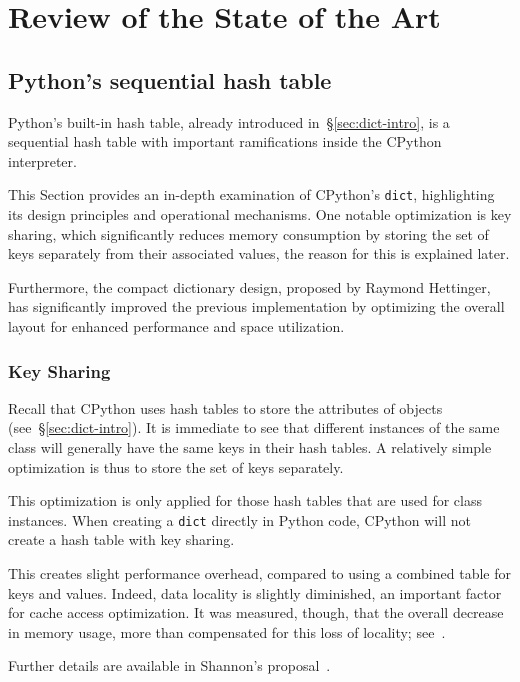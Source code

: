 \chapter{Review of the State of the Art}\label{ch:review}


\section{Python's sequential hash table}\label{sec:python-dict-review}

Python's built-in hash table, already introduced in~\S\ref{sec:dict-intro}, is a sequential hash table with important ramifications inside the CPython interpreter.

This Section provides an in-depth examination of CPython's \texttt{dict}, highlighting its design principles and operational mechanisms.
One notable optimization is key sharing, which significantly reduces memory consumption by storing the set of keys separately from their associated values, the reason for this is explained later.

Furthermore, the compact dictionary design, proposed by Raymond Hettinger, has significantly improved the previous implementation by optimizing the overall layout for enhanced performance and space utilization.


\subsection{Key Sharing}\label{subsec:key-sharing}

Recall that CPython uses hash tables to store the attributes of objects (see~\S\ref{sec:dict-intro}).
It is immediate to see that different instances of the same class will generally have the same keys in their hash tables.
A relatively simple optimization is thus to store the set of keys separately.

This optimization is only applied for those hash tables that are used for class instances.
When creating a \texttt{dict} directly in Python code, CPython will not create a hash table with key sharing.

This creates slight performance overhead, compared to using a combined table for keys and values.
Indeed, data locality is slightly diminished, an important factor for cache access optimization.
It was measured, though, that the overall decrease in memory usage, more than compensated for this loss of locality; see~\cite[\S Performance, Speed]{pep412}.

Further details are available in Shannon's proposal~\cite{pep412}.



